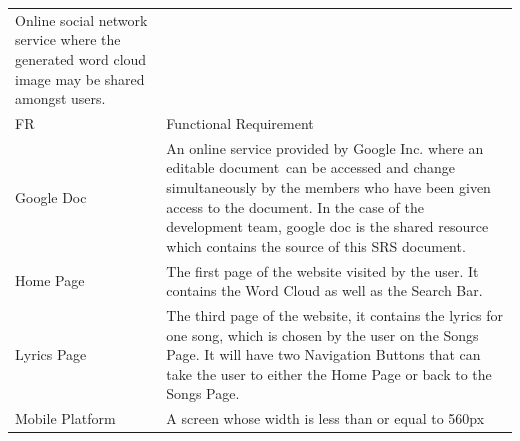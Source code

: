 \documentclass[]{article}
\begin{document}
\begin{longtable}[c]{@{}ll@{}}
\begin{minipage}[t]{0.47\columnwidth}
Online social network service where the generated word cloud image may
be shared amongst users.
\end{minipage}
\\\addlinespace
\begin{minipage}[t]{0.47\columnwidth}\raggedright
FR
\end{minipage} & \begin{minipage}[t]{0.47\columnwidth}\raggedright
Functional Requirement
\end{minipage}
\\\addlinespace
\begin{minipage}[t]{0.47\columnwidth}\raggedright
Google Doc
\end{minipage} & \begin{minipage}[t]{0.47\columnwidth}\raggedright
An online service provided by Google Inc. where an editable document~can
be accessed and change simultaneously by the members who have been given
access to the document. In the case of the development team, google doc
is the shared resource which contains the source of this SRS document.
\end{minipage}
\\\addlinespace
\begin{minipage}[t]{0.47\columnwidth}\raggedright
Home Page
\end{minipage} & \begin{minipage}[t]{0.47\columnwidth}\raggedright
The first page of the website visited by the user. It contains the Word
Cloud as well as the Search Bar.
\end{minipage}
\\\addlinespace
\begin{minipage}[t]{0.47\columnwidth}\raggedright
Lyrics Page
\end{minipage} & \begin{minipage}[t]{0.47\columnwidth}\raggedright
The third page of the website, it contains the lyrics for one song,
which is chosen by the user on the Songs Page. It will have two
Navigation Buttons that can take the user to either the Home Page or
back to the Songs Page.
\end{minipage}
\\\addlinespace
\begin{minipage}[t]{0.47\columnwidth}\raggedright
Mobile Platform
\end{minipage} & \begin{minipage}[t]{0.47\columnwidth}\raggedright
A screen whose width is less than or equal to 560px
\end{minipage}

\end{longtable}
\end{document}
